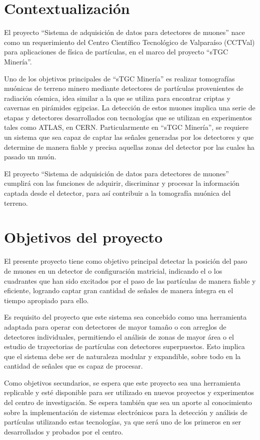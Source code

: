 

\section{Contextualización}
	\par El proyecto ``Sistema de adquisición de datos para detectores de muones'' nace como un requerimiento del Centro Científico Tecnológico de Valparaíso (CCTVal) para aplicaciones de física de partículas, en el marco del proyecto ``sTGC Minería''. 
	
	\par Uno de los objetivos principales de ``sTGC Minería'' es realizar tomografías muónicas de terreno minero mediante detectores de partículas provenientes de radiación cósmica, idea similar a la que se utiliza para encontrar criptas y cavernas en pirámides egipcias. La detección de estos muones implica una serie de etapas y detectores desarrollados con tecnologías que se utilizan en experimentos tales como ATLAS, en CERN. Particularmente en ``sTGC Minería'', se requiere un sistema que sea capaz de captar las señales generadas por los detectores y que determine de manera fiable y precisa aquellas zonas del detector por las cuales ha pasado un muón.
	
	\par El proyecto ``Sistema de adquisición de datos para detectores de muones'' cumplirá con las funciones de adquirir, discriminar y procesar la información captada desde el detector, para así contribuir a la tomografía muónica del terreno.

\section{Objetivos del proyecto}\label{sec:objetivos}
	\par El presente proyecto tiene como objetivo principal detectar la posición del paso de muones en un detector de configuración matricial, indicando el o los cuadrantes que han sido excitados por el paso de las partículas de manera fiable y eficiente, logrando captar gran cantidad de señales de manera íntegra en el tiempo apropiado para ello.
	\par Es requisito del proyecto que este sistema sea concebido como una herramienta adaptada para operar con detectores de mayor tamaño o con arreglos de detectores individuales, permitiendo el análisis de zonas de mayor área o el estudio de trayectorias de partículas con detectores superpuestos. Esto implica que el sistema debe ser de naturaleza modular y expandible, sobre todo en la cantidad de señales que es capaz de procesar.
	\par Como objetivos secundarios, se espera que este proyecto sea una herramienta replicable y esté disponible para ser utilizado en nuevos proyectos y experimentos del centro de investigación. Se espera también que sea un aporte al conocimiento sobre la implementación de sistemas electrónicos para la detección y análisis de partículas utilizando estas tecnologías, ya que será uno de los primeros en ser desarrollados y probados por el centro.\\								


